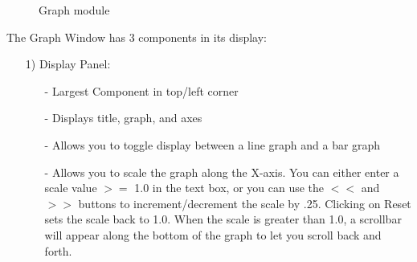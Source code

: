 \documentclass[10pt,dvips]{article}
\begin{document}
   \begin{figure}[htb]
   \center
   \caption{Graph module}
   \label{graph}
   \end{figure}

      The Graph Window has 3 components in its display:
   \begin{enumerate}
   \item[1)]
   Display Panel:
      \begin{itemize}
      \item[-]
        Largest Component in top/left corner
      \item[-]
        Displays title, graph, and axes
      \item[-]
        Allows you to toggle display between a line graph and a bar graph
      \item[-]
        Allows you to scale the graph along the X-axis.  You can either enter
        a scale value $>=$ 1.0 in the text box, or you can use the $<<$ and $>>$
        buttons to increment/decrement the scale by .25.  Clicking on Reset
        sets the scale back to 1.0.  When the scale is greater than 1.0, a
        scrollbar will appear along the bottom of the graph to let you
        scroll back and forth.
      \end{itemize}


\end{enumerate}
\end{document}
